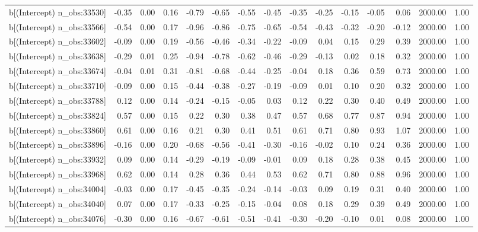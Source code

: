 \begin{table}[ht]
\begin{tabular}{rrrrrrrrrrrrrrr}
  b[(Intercept) n\_obs:33530] & -0.35 & 0.00 & 0.16 & -0.79 & -0.65 & -0.55 & -0.45 & -0.35 & -0.25 & -0.15 & -0.05 & 0.06 & 2000.00 & 1.00 \\ 
  b[(Intercept) n\_obs:33566] & -0.54 & 0.00 & 0.17 & -0.96 & -0.86 & -0.75 & -0.65 & -0.54 & -0.43 & -0.32 & -0.20 & -0.12 & 2000.00 & 1.00 \\ 
  b[(Intercept) n\_obs:33602] & -0.09 & 0.00 & 0.19 & -0.56 & -0.46 & -0.34 & -0.22 & -0.09 & 0.04 & 0.15 & 0.29 & 0.39 & 2000.00 & 1.00 \\ 
  b[(Intercept) n\_obs:33638] & -0.29 & 0.01 & 0.25 & -0.94 & -0.78 & -0.62 & -0.46 & -0.29 & -0.13 & 0.02 & 0.18 & 0.32 & 2000.00 & 1.00 \\ 
  b[(Intercept) n\_obs:33674] & -0.04 & 0.01 & 0.31 & -0.81 & -0.68 & -0.44 & -0.25 & -0.04 & 0.18 & 0.36 & 0.59 & 0.73 & 2000.00 & 1.00 \\ 
  b[(Intercept) n\_obs:33710] & -0.09 & 0.00 & 0.15 & -0.44 & -0.38 & -0.27 & -0.19 & -0.09 & 0.01 & 0.10 & 0.20 & 0.32 & 2000.00 & 1.00 \\ 
  b[(Intercept) n\_obs:33788] & 0.12 & 0.00 & 0.14 & -0.24 & -0.15 & -0.05 & 0.03 & 0.12 & 0.22 & 0.30 & 0.40 & 0.49 & 2000.00 & 1.00 \\ 
  b[(Intercept) n\_obs:33824] & 0.57 & 0.00 & 0.15 & 0.22 & 0.30 & 0.38 & 0.47 & 0.57 & 0.68 & 0.77 & 0.87 & 0.94 & 2000.00 & 1.00 \\ 
  b[(Intercept) n\_obs:33860] & 0.61 & 0.00 & 0.16 & 0.21 & 0.30 & 0.41 & 0.51 & 0.61 & 0.71 & 0.80 & 0.93 & 1.07 & 2000.00 & 1.00 \\ 
  b[(Intercept) n\_obs:33896] & -0.16 & 0.00 & 0.20 & -0.68 & -0.56 & -0.41 & -0.30 & -0.16 & -0.02 & 0.10 & 0.24 & 0.36 & 2000.00 & 1.00 \\ 
  b[(Intercept) n\_obs:33932] & 0.09 & 0.00 & 0.14 & -0.29 & -0.19 & -0.09 & -0.01 & 0.09 & 0.18 & 0.28 & 0.38 & 0.45 & 2000.00 & 1.00 \\ 
  b[(Intercept) n\_obs:33968] & 0.62 & 0.00 & 0.14 & 0.28 & 0.36 & 0.44 & 0.53 & 0.62 & 0.71 & 0.80 & 0.88 & 0.96 & 2000.00 & 1.00 \\ 
  b[(Intercept) n\_obs:34004] & -0.03 & 0.00 & 0.17 & -0.45 & -0.35 & -0.24 & -0.14 & -0.03 & 0.09 & 0.19 & 0.31 & 0.40 & 2000.00 & 1.00 \\ 
  b[(Intercept) n\_obs:34040] & 0.07 & 0.00 & 0.17 & -0.33 & -0.25 & -0.15 & -0.04 & 0.08 & 0.18 & 0.29 & 0.39 & 0.49 & 2000.00 & 1.00 \\ 
  b[(Intercept) n\_obs:34076] & -0.30 & 0.00 & 0.16 & -0.67 & -0.61 & -0.51 & -0.41 & -0.30 & -0.20 & -0.10 & 0.01 & 0.08 & 2000.00 & 1.00 \\ 

\end{tabular}
\end{table}
